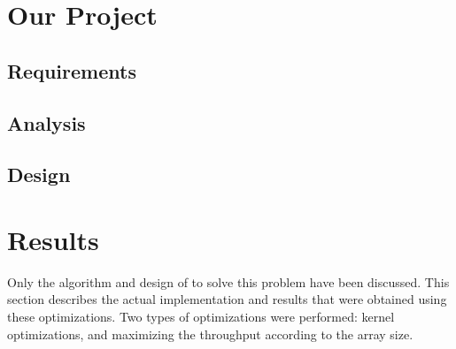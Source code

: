 \documentclass[10pt]{article}
\begin{document}
\begin{multicols}{2}
\section{Our Project}
    \subsection{Requirements} %
    \subsection{Analysis} %
    \subsection{Design} %

\section{Results} %
Only the algorithm and design of to solve this problem have been discussed.
This section describes the actual implementation and results that were obtained using these optimizations.
Two types of optimizations were performed: kernel optimizations, and maximizing the throughput according to the array size.

\end{multicols}
\end{document}
